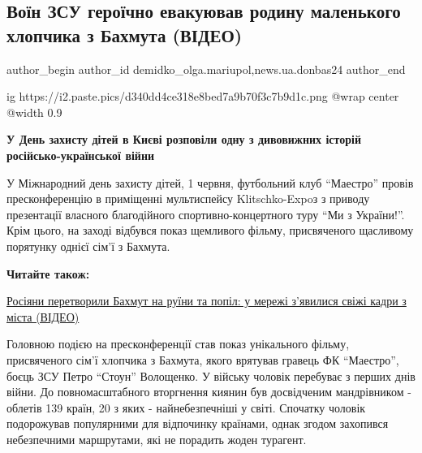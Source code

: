  
 
 
 
 
 
\subsection{Воїн ЗСУ героїчно евакуював родину маленького хлопчика з Бахмута (ВІДЕО)}
\label{sec:01_06_2023.stz.news.ua.donbas24.1.voin_zsu_evakuacia_rodyna_hlopchyk_bahmut}
 
\ifcmt
 author_begin
   author_id demidko_olga.mariupol,news.ua.donbas24
 author_end
\fi

\ifcmt
  ig https://i2.paste.pics/d340dd4ce318e8bed7a9b70f3c7b9d1c.png
  @wrap center
  @width 0.9
\fi

\begin{qqquote}
\Large\bfseries
У День захисту дітей в Києві розповіли одну з дивовижних історій російсько-української війни
\end{qqquote}

У Міжнародний день захисту дітей, 1 червня, футбольний клуб \enquote{Маестро} провів
пресконференцію в приміщенні мультиспейсу Klitschko-Expoз з приводу презентації
власного благодійного спортивно-концертного туру \enquote{Ми з України!}. Крім цього,
на заході відбувся показ щемливого фільму, присвяченого щасливому порятунку
однієї сім'ї з Бахмута.

\textbf{Читайте також:} 

\href{https://donbas24.news/news/rosiyani-peretvorili-baxmut-na-ruyini-ta-popil-u-merezi-zyavilisya-svizi-kadri-z-mista-video}{Росіяни перетворили Бахмут на руїни та попіл: у мережі з'явилися свіжі кадри з міста (ВІДЕО)}

Головною подією на пресконференції став показ унікального фільму, присвяченого
сім'ї хлопчика з Бахмута, якого врятував гравець ФК \enquote{Маестро}, боєць ЗСУ Петро
\enquote{Стоун} Волощенко. У війську чоловік перебуває з перших днів війни. До
повномасштабного вторгнення киянин був досвідченим мандрівником - облетів 139
країн, 20 з яких - найнебезпечніші у світі. Спочатку чоловік подорожував
популярними для відпочинку країнами, однак згодом захопився небезпечними
маршрутами, які не порадить жоден турагент. 

